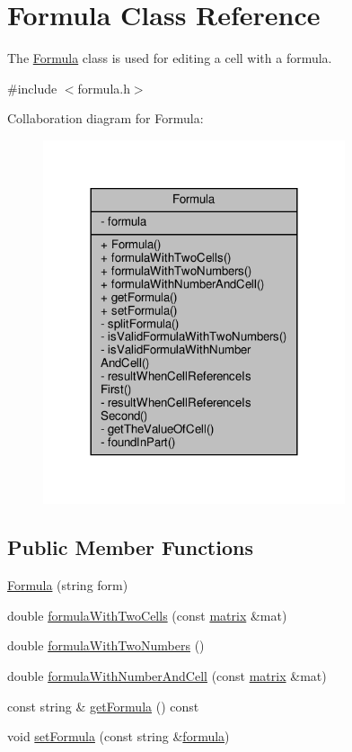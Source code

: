 \hypertarget{class_formula}{}\section{Formula Class Reference}
\label{class_formula}


The \hyperlink{class_formula}{Formula} class is used for editing a cell with a formula.  




{\ttfamily \#include $<$formula.\+h$>$}



Collaboration diagram for Formula\+:\nopagebreak
\begin{figure}[H]
\begin{center}
\leavevmode
\includegraphics[width=252pt]{class_formula__coll__graph}
\end{center}
\end{figure}
\subsection*{Public Member Functions}
\begin{DoxyCompactItemize}
\item 
\hyperlink{class_formula_aed38ad076eb638148bcbe867d6acea60}{Formula} (string form)
\item 
double \hyperlink{class_formula_a518bc97bd50f1cc5573be7d3f8cb6253}{formula\+With\+Two\+Cells} (const \hyperlink{formula_8h_a869e2a5deeb3daa4c82d6bc91cf20d92}{matrix} \&mat)
\item 
double \hyperlink{class_formula_a2159ffdb34d80f2bee422eee89fc871a}{formula\+With\+Two\+Numbers} ()
\item 
double \hyperlink{class_formula_a0f831b2ee98fbeb7df371f83ee7d374d}{formula\+With\+Number\+And\+Cell} (const \hyperlink{formula_8h_a869e2a5deeb3daa4c82d6bc91cf20d92}{matrix} \&mat)
\item 
const string \& \hyperlink{class_formula_a1b9557287ed502f9523c5c7b1805bac1}{get\+Formula} () const
\item 
void \hyperlink{class_formula_aba7633655dad414ed0a1d92cdba38163}{set\+Formula} (const string \&\hyperlink{class_formula_a2a3b5b998b48db1fadf57752e59ed4fb}{formula})
\end{DoxyCompactItemize}
